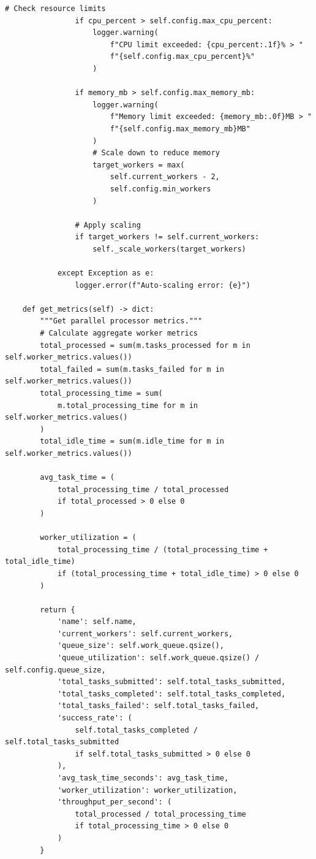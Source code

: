 \begin{lstlisting}[style=python, caption={Parallel Processor with Dynamic Allocation}]
                # Check resource limits
                if cpu_percent > self.config.max_cpu_percent:
                    logger.warning(
                        f"CPU limit exceeded: {cpu_percent:.1f}% > "
                        f"{self.config.max_cpu_percent}%"
                    )

                if memory_mb > self.config.max_memory_mb:
                    logger.warning(
                        f"Memory limit exceeded: {memory_mb:.0f}MB > "
                        f"{self.config.max_memory_mb}MB"
                    )
                    # Scale down to reduce memory
                    target_workers = max(
                        self.current_workers - 2,
                        self.config.min_workers
                    )

                # Apply scaling
                if target_workers != self.current_workers:
                    self._scale_workers(target_workers)

            except Exception as e:
                logger.error(f"Auto-scaling error: {e}")

    def get_metrics(self) -> dict:
        """Get parallel processor metrics."""
        # Calculate aggregate worker metrics
        total_processed = sum(m.tasks_processed for m in self.worker_metrics.values())
        total_failed = sum(m.tasks_failed for m in self.worker_metrics.values())
        total_processing_time = sum(
            m.total_processing_time for m in self.worker_metrics.values()
        )
        total_idle_time = sum(m.idle_time for m in self.worker_metrics.values())

        avg_task_time = (
            total_processing_time / total_processed
            if total_processed > 0 else 0
        )

        worker_utilization = (
            total_processing_time / (total_processing_time + total_idle_time)
            if (total_processing_time + total_idle_time) > 0 else 0
        )

        return {
            'name': self.name,
            'current_workers': self.current_workers,
            'queue_size': self.work_queue.qsize(),
            'queue_utilization': self.work_queue.qsize() / self.config.queue_size,
            'total_tasks_submitted': self.total_tasks_submitted,
            'total_tasks_completed': self.total_tasks_completed,
            'total_tasks_failed': self.total_tasks_failed,
            'success_rate': (
                self.total_tasks_completed / self.total_tasks_submitted
                if self.total_tasks_submitted > 0 else 0
            ),
            'avg_task_time_seconds': avg_task_time,
            'worker_utilization': worker_utilization,
            'throughput_per_second': (
                total_processed / total_processing_time
                if total_processing_time > 0 else 0
            )
        }


\end{lstlisting}
